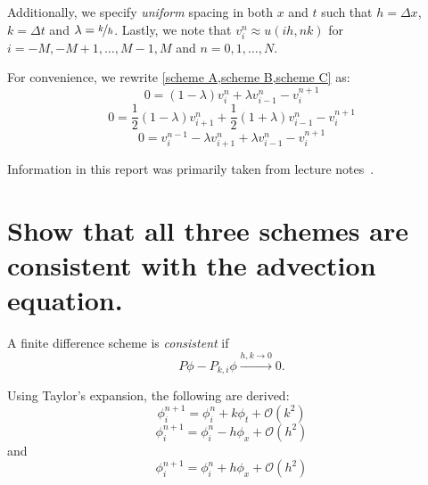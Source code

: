 \documentclass{hw_report}
\begin{document}
    Additionally, we specify \textit{uniform} spacing in both $x$ and $t$ such that $h=\Delta x$, $k=\Delta t$ and $\lambda = \nicefrac{k}{h}$.
    Lastly, we note that $v_i^n\approx u(ih,nk)$ for $i=-M,-M+1,\ldots,M-1,M$ and $n=0,1,\ldots,N$.

    For convenience, we rewrite \cref{scheme A,scheme B,scheme C} as:
    \begin{equation}
        \label{scheme A'}
        \tag{A'}
        0=(1-\lambda)v_i^n+\lambda v_{i-1}^n-v^{n+1}_i
    \end{equation}
    \begin{equation}
        \label{scheme B'}
        \tag{B'}
        0=\frac{1}{2}(1-\lambda)v_{i+1}^n + \frac{1}{2}(1+\lambda)v_{i-1}^n-v^{n+1}_i
    \end{equation}
    \begin{equation}
        \label{scheme C'}
        \tag{C'}
        0=v_i^{n-1}-\lambda v_{i+1}^n +\lambda v_{i-1}^n-v^{n+1}_i
    \end{equation}

    Information in this report was primarily taken from lecture notes~\cite{Motamed}.


    \section{Show that all three schemes are consistent with the advection equation.}
    \begin{definition}[Consistency]\label{eq:consistency}
        A finite difference scheme is \textit{consistent} if
        \begin{equation}
            P\phi -P_{k,i}\phi \xrightarrow{h,k\to 0} 0.
        \end{equation}
    \end{definition}

    Using Taylor's expansion, the following are derived:
    \begin{equation}
        \phi_i^{n+1} = \phi_i^n +k\phi_t + \mathcal{O}(k^2)
    \end{equation}
    \begin{equation}
        \phi_i^{n+1} = \phi_i^n -h\phi_x + \mathcal{O}(h^2)
    \end{equation}
    and
    \begin{equation}
        \phi_i^{n+1} = \phi_i^n+h\phi_x+\mathcal{O}(h^2)
    \end{equation}
\end{document}
